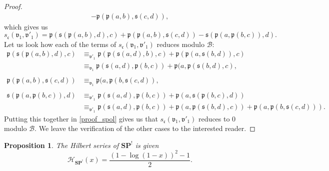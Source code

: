 \documentclass[11pt]{article}
\newtheorem{prop}[theo]{Proposition}
\theoremstyle{definition}
\numberwithin{equation}{section}
\newcommand{\op}[1]{\mathbf{#1}}
\newcommand{\hilbert}[1]{\mathcal{H}_{#1}}
\newcommand{\SP}{\op{SP}}
\begin{document}
\begin{proof}
\begin{equation}
\begin{split}
    -\mathfrak{p}(\mathfrak{p}(a,b),\mathfrak{s}(c,d)),
\end{split}\end{equation}
which gives us
\begin{equation}\label{proof_spol}
    s_{\mathfrak{c}}(\mathfrak{v}_1,\mathfrak{v'}_1) =  \mathfrak{p}(\mathfrak{s}(\mathfrak{p}(a,b),d),c) + \mathfrak{p}(\mathfrak{p}(a,b),\mathfrak{s}(c,d))
    -\mathfrak{s}(\mathfrak{p}(a,\mathfrak{p}(b,c)),d).
\end{equation}
Let us look how each of the terms of $s_{\mathfrak{c}}(\mathfrak{v}_1,\mathfrak{v'}_1)$ reduces 
modulo $\mathcal{B}$:
\begin{equation}\begin{split}
    \mathfrak{p}(\mathfrak{s}(\mathfrak{p}(a,b),d),c)
    &\equiv_{\mathfrak{v'}_1} \mathfrak{p}(\mathfrak{p}(\mathfrak{s}(a,d),b),c) + \mathfrak{p}(\mathfrak{p}(a,\mathfrak{s}(b,d)),c) \\
    &\equiv_{\mathfrak{v}_1} \mathfrak{p}(\mathfrak{s}(a,d),\mathfrak{p}(b,c)) + \mathfrak{p}(a, \mathfrak{p}(\mathfrak{s}(b,d),c), \\
    & \\
    \mathfrak{p}(\mathfrak{p}(a,b),\mathfrak{s}(c,d)) &\equiv_{\mathfrak{v}_1} \mathfrak{p}(a, \mathfrak{p}(b,\mathfrak{s}(c,d)), \\
    & \\
    \mathfrak{s}(\mathfrak{p}(a,\mathfrak{p}(b,c)),d) &\equiv_{\mathfrak{v'}_1} \mathfrak{p}(\mathfrak{s}(a,d),\mathfrak{p}(b,c)) +
    \mathfrak{p}(a,\mathfrak{s}(\mathfrak{p}(b,c),d))\\
    &\equiv_{\mathfrak{v'}_1} \mathfrak{p}(\mathfrak{s}(a,d),\mathfrak{p}(b,c)) + \mathfrak{p}(a,\mathfrak{p}(\mathfrak{s}(b,d),c)) +
    \mathfrak{p}(a,\mathfrak{p}(b,\mathfrak{s}(c,d))).
\end{split}\end{equation}
Putting this together in \eqref{proof_spol} gives us that $s_{\mathfrak{c}}(\mathfrak{v}_1,\mathfrak{v'}_1)$ 
reduces to $0$ modulo $\mathcal{B}$. We leave the verification of the other cases to the interested reader.
\end{proof}

\begin{prop} \label{prop_sp_hilbert}
    The Hilbert series of $\SP^{!}$ is given
    \begin{equation}
        \hilbert{\SP^!}(x) = \dfrac{(1-\log(1-x))^2-1}{2}.
    \end{equation}
\end{prop}
\end{document}

